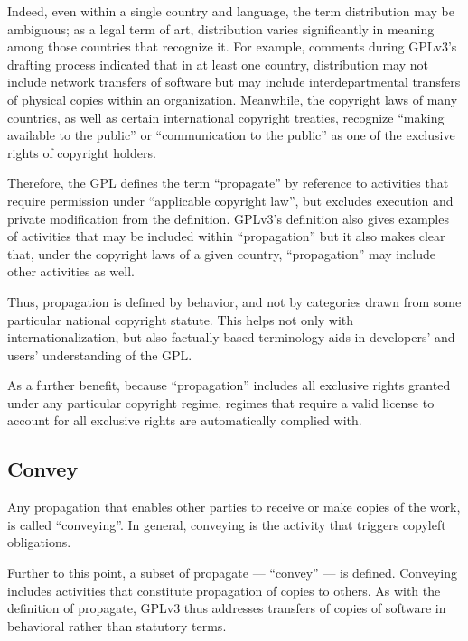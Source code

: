 Indeed, even within a single country and language, the term distribution may
be ambiguous; as a legal term of art, distribution varies significantly in
meaning among those countries that recognize it.  For example, comments
during GPLv3's drafting process indicated that in at least one country,
distribution may not include network transfers of software but may include
interdepartmental transfers of physical copies within an organization.
Meanwhile, the copyright laws of many countries, as well as certain
international copyright treaties, recognize ``making available to the
public'' or ``communication to the public'' as one of the exclusive rights of
copyright holders.

Therefore, the GPL defines the term ``propagate'' by reference to activities
that require permission under ``applicable copyright law'', but excludes
execution and private modification from the definition.  GPLv3's definition
also gives examples of activities that may be included within ``propagation''
but it also makes clear that, under the copyright laws of a given country,
``propagation'' may include other activities as well.

Thus, propagation is defined by behavior, and not by categories drawn from
some particular national copyright statute.  This helps not only with
internationalization, but also factually-based terminology aids in
developers' and users' understanding of the GPL\@.


As a further benefit, because ``propagation'' includes all
exclusive rights granted under any particular copyright regime, regimes that
require a valid license to account for all exclusive rights are automatically
complied with.

\subsection{Convey}


Any propagation that enables other parties to receive or make copies of the
work, is called ``conveying''. In general, conveying is the activity that
triggers copyleft obligations.

Further to this point, a subset of propagate --- ``convey'' --- is defined.
Conveying includes activities that constitute propagation of copies to
others.  As with the definition of propagate, GPLv3 thus addresses transfers
of copies of software in behavioral rather than statutory terms.  


